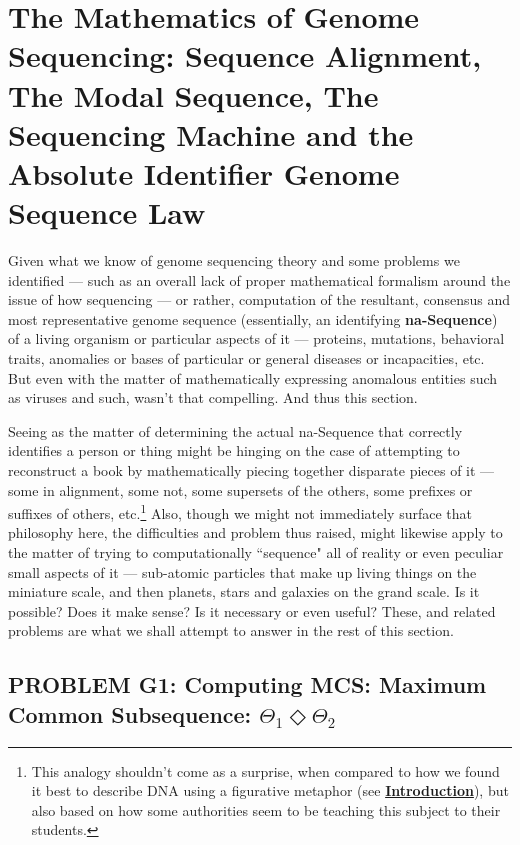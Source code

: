 \documentclass[a4paper, 18pt]{book} %
\begin{document}
\chapter{The Mathematics of Genome Sequencing: Sequence Alignment, The Modal Sequence, The Sequencing Machine and the Absolute Identifier Genome Sequence Law}
\label{SECMATHSEQ}

Given what we know of genome sequencing theory and some problems we identified --- such as an overall lack of proper mathematical formalism around the issue of how sequencing --- or rather, computation of the resultant, consensus and most representative genome sequence (essentially, an identifying \textbf{na-Sequence}) of a living organism or particular aspects of it --- proteins, mutations, behavioral traits, anomalies or bases of particular or general diseases or incapacities, etc. But even with the matter of mathematically expressing anomalous entities such as viruses and such, wasn't that compelling. And thus this section.

Seeing as the matter of determining the actual na-Sequence that correctly identifies a person or thing might be hinging on the case of attempting to reconstruct a book by mathematically piecing together disparate pieces of it --- some in alignment, some not, some supersets of the others, some prefixes or suffixes of others, etc.\footnote{This analogy shouldn't come as a surprise, when compared to how we found it best to describe DNA using a figurative metaphor (see \textbf{\hyperref[SEC1]{Introduction}}), but also based on how some authorities seem to be teaching this subject to their students\cite{przytycka_wgs_lecture10}.} Also, though we might not immediately surface that philosophy here, the difficulties and problem thus raised, might likewise apply to the matter of trying to computationally ``sequence" all of reality or even peculiar small aspects of it --- sub-atomic particles that make up living things on the miniature scale, and then planets, stars and galaxies on the grand scale. Is it possible? Does it make sense? Is it necessary or even useful? These, and related problems are what we shall attempt to answer in the rest of this section.

\section{PROBLEM G1: Computing MCS: Maximum Common Subsequence: $\Theta_1 \Diamond \Theta_2$}
\label{PROBG1}
\end{document}
